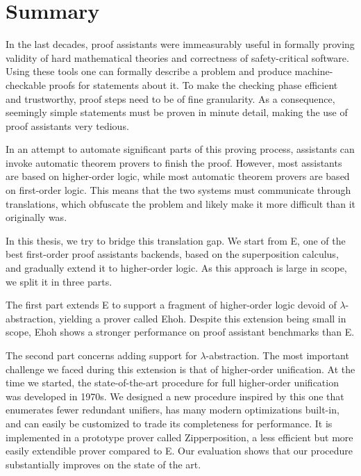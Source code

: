 \chapter*{Summary}

In the last decades, proof assistants were immeasurably useful in formally
proving validity of hard mathematical theories and correctness of
safety-critical software. Using these tools one can formally describe a problem
and produce machine-checkable proofs for statements about it. To make the
checking phase efficient and trustworthy, proof steps need to be of fine
granularity. As a consequence, seemingly simple statements must be proven in
minute detail, making the use of proof assistants very tedious.

In an attempt to automate significant parts of this proving process, assistants
can invoke automatic theorem provers to finish the proof. However, most
assistants are based on higher-order logic, while most automatic theorem provers
are based on first-order logic. This means that the two systems must communicate
through translations, which obfuscate the problem and likely make it more
difficult than it originally was.

In this thesis, we try to bridge this translation gap. We start from E, one of the best
first-order proof assistants backends, based on the superposition calculus, and
gradually extend it to higher-order logic. As this approach is large in scope,
we split it in three parts.

The first part extends E to support a fragment of higher-order logic devoid of
$\lambda$-abstra\-ction, yielding a prover called Ehoh. Despite this extension being small in scope, 
Ehoh shows a stronger performance on proof assistant benchmarks than E.

The second part concerns adding support for $\lambda$-abstraction. The most
important challenge we faced during this extension is that of higher-order
unification. At the time we started, the state-of-the-art procedure
for full higher-order unification was developed in 1970s. We designed a new
procedure inspired by this one that enumerates fewer redundant unifiers, has many
modern optimizations built-in, and can easily be customized to trade its
completeness for performance. It is implemented in a
prototype prover called Zipperposition, a less efficient but more easily extendible
prover compared to E. Our evaluation shows that our
procedure substantially improves on the state of the art.

